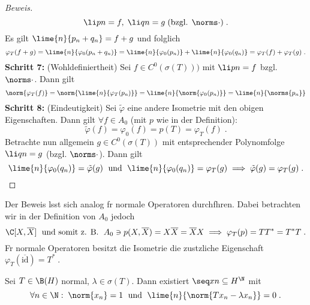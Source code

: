\begin{proof}[Beweis]
	\[\li pn = f,\; \li qn = g \;\text{(bzgl. $\norms\cdot$)}\;.\]
	Es gilt \(\lime{n}{p_n + q_n}= f+g\) und folglich
	\[\varphi_T(f+g) = \lime{n}{\varphi_0(p_n + q_n)} = \lime{n}{\varphi_0(p_n)} + \lime{n}{\varphi_0(q_n)} = \varphi_T(f) + \varphi_T(g)\;.\]
	\textbf{Schritt 7:} (Wohldefiniertheit) Sei \(f\in C^0(\sigma(T)))\) mit \(\li pn = f\) bzgl. \(\norms\cdot\). Dann gilt 
	\[\norm{\varphi_T(f)} = \norm{\lime{n}{\varphi_T(p_n)}} = \lime{n}{\norm{\varphi_0(p_n)}} = \lime{n}{\norms{p_n}} \]
	\textbf{Schritt 8:} (Eindeutigkeit) Sei \(\tilde\varphi\) eine andere Isometrie mit den obigen Eigenschaften. Dann gilt \(\forall f \in A_0\) (mit $p$ wie in der Definition):
	\[\tilde \varphi(f) = \varphi_0(f) = p(T) = \varphi_T(f)\;.\]
	Betrachte nun allgemein \(g \in C^0(\sigma(T))\) mit entsprechender Polynomfolge \(\li qn = g\) (bzgl. $\norms\cdot$). Dann gilt
	\[\lime{n}{\varphi_0(q_n)} = \tilde\varphi(g) \;\text{ und }\; \lime{n}{\varphi_0(q_n)} =\varphi_T(g) \implies \tilde\varphi(g) = \varphi_T(g)\;.\]
	\end{proof}
	\begin{rem}
	  Der Beweis l\as sst sich analog f\us r normale Operatoren durchf\us hren. Dabei betrachten wir in der Definition von $A_0$ jedoch 
	  \[\C[X, \overline X] \;\text{ und somit z. B. }\; A_0 \ni p(X, \overline X) = X\overline X = \overline X X \implies \varphi_T(p) = TT^* = T^*T\;.\]
	  F\us r normale Operatoren besitzt die Isometrie die zus\as tzliche Eigenschaft
	  \(\varphi_T(\overline {\text{id}}) = T^*\;.\)
	  \end{rem}
	\begin{lemma}
		\label{spektrum_normal}
		Sei \(T\in \B(H)\) normal, \(\lambda \in \sigma(T)\). Dann existiert \(\seq xn \subseteq H^\N\) mit 
		\[\forall n \in \N: \; \norm{x_n} = 1 \;\text{ und }\;  \lime{n}{\norm{Tx_n - \lambda x_n}} = 0\;.\]
	\end{lemma}
